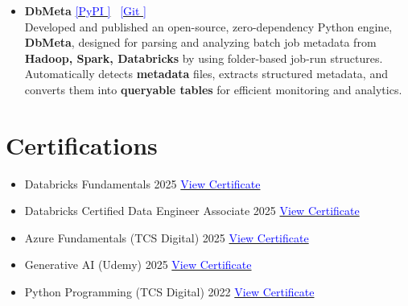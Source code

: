 \documentclass[letterpaper,11pt]{article}
\begin{document}
\begin{itemize}[leftmargin=0.15in, label={}]
\item 
\textbf{DbMeta} \hfill 
\href{https://pypi.org/project/dbmeta/}{\textcolor{blue}{[PyPI \faExternalLink]}} \,
\href{https://github.com/himanshuclub88/dbmeta}{\textcolor{blue}{[Git \faExternalLink]}} \\
Developed and published an open-source, zero-dependency Python engine, \textbf{DbMeta}, designed for parsing and analyzing batch job metadata from \textbf{ Hadoop, Spark, Databricks } by using folder-based job-run structures. 
Automatically detects \textbf{metadata} files, extracts structured metadata, and converts them into \textbf{queryable tables} for efficient monitoring and analytics.
\end{itemize}



\section{Certifications}
 \begin{itemize}[leftmargin=0.15in, label={}]

    \item{Databricks Fundamentals \textbar{} 2025 \hfill
    \href{https://credentials.databricks.com/8e23b34d-2e9a-436b-ad75-4c047c53bf55#acc.ZUbGNQuH}{\textcolor{blue}{View Certificate \faExternalLink}}}

    \item{Databricks Certified Data Engineer Associate \textbar{} 2025 \hfill
    \href{https://credentials.databricks.com/f6801ea1-92fb-4db0-afc8-bb3c42222a37#acc.CinJjBE8}{\textcolor{blue}{View Certificate \faExternalLink}}}
    
    \item{Azure Fundamentals (TCS Digital) \textbar{} 2025 \hfill
    \href{https://drive.google.com/file/d/1j9oagnlV8IDNerikqXcg9S0tCgJEIu8T/view?usp=drive_link}{\textcolor{blue}{View Certificate \faExternalLink}}}

    \item{Generative AI (Udemy) \textbar{} 2025 \hfill
    \href{https://www.udemy.com/certificate/UC-412f4ed7-5ae4-4964-a02b-4944ae58bbbc/}{\textcolor{blue}{View Certificate \faExternalLink}}}
    
    \item{Python Programming (TCS Digital) \textbar{} 2022 \hfill
    \href{https://drive.google.com/file/d/13DMcNhRNcbFE-joFHZPzwJelQUFm0IBI/view?usp=sharing}{\textcolor{blue}{View Certificate \faExternalLink}}}
    
    
  \end{itemize}
\end{document}

